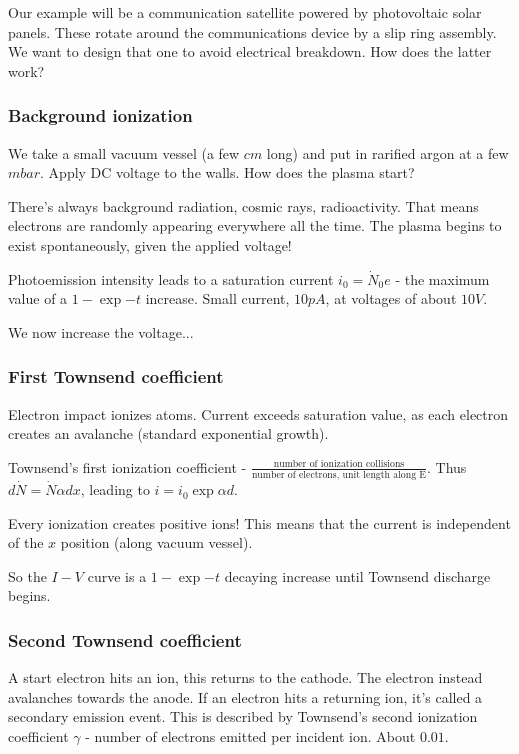 \documentclass[PlasmaNotes.tex]{subfiles}
\begin{document}
Our example will be a communication satellite powered by photovoltaic solar panels. These rotate around the communications device by a slip ring assembly. We want to design that one to avoid electrical breakdown. How does the latter work?

\subsubsection{Background ionization}

We take a small vacuum vessel (a few $cm$ long) and put in rarified argon at a few $mbar$. Apply DC voltage to the walls. How does the plasma start?

There's always background radiation, cosmic rays, radioactivity. That means electrons are randomly appearing everywhere all the time. The plasma begins to exist spontaneously, given the applied voltage!

Photoemission intensity leads to a saturation current $i_0 = \dot{N}_0 e$ - the maximum value of a $1-\exp{-t}$ increase. Small current, $10 pA$, at voltages of about $10 V$.

We now increase the voltage...

\subsubsection{First Townsend coefficient}

Electron impact ionizes atoms. Current exceeds saturation value, as each electron creates an avalanche (standard exponential growth).

Townsend's first ionization coefficient - $\frac{\text{number of ionization collisions}}{\text{number of electrons, unit length along E}}$. Thus $d\dot{N} = \dot{N} \alpha dx$, leading to $i=i_0 \exp{\alpha d}$.

Every ionization creates positive ions! This means that the current is independent of the $x$ position (along vacuum vessel).

So the $I-V$ curve is a $1-\exp{-t}$ decaying increase until Townsend discharge begins.

\subsubsection{Second Townsend coefficient}

A start electron hits an ion, this returns to the cathode. The electron instead avalanches towards the anode. If an electron hits a returning ion, it's called a secondary emission event. This is described by Townsend's second ionization coefficient $\gamma$ - number of electrons emitted per incident ion. About $0.01$. 
\end{document}
